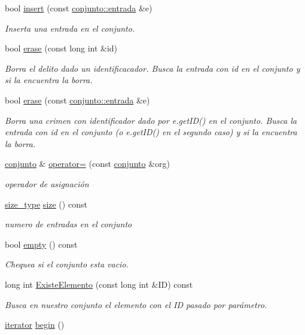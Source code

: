 \begin{DoxyCompactItemize}
bool \hyperlink{classconjunto_aa65b9f7c4cb9bad6d4e40c1973095930}{insert} (const \hyperlink{classconjunto_a09cad766dd65de73e51eae21f9d22585}{conjunto\+::entrada} \&e)
\begin{DoxyCompactList}\small\item\em Inserta una entrada en el conjunto. \end{DoxyCompactList}\item 
bool \hyperlink{classconjunto_ad550177fa4454da3a10fa356417e39a7}{erase} (const long int \&id)
\begin{DoxyCompactList}\small\item\em Borra el delito dado un identificacador. Busca la entrada con id en el conjunto y si la encuentra la borra. \end{DoxyCompactList}\item 
bool \hyperlink{classconjunto_a77a21ed91f1002f4eaed48d86535a874}{erase} (const \hyperlink{classconjunto_a09cad766dd65de73e51eae21f9d22585}{conjunto\+::entrada} \&e)
\begin{DoxyCompactList}\small\item\em Borra una crimen con identificador dado por e.\+get\+I\+D() en el conjunto. Busca la entrada con id en el conjunto (o e.\+get\+I\+D() en el segundo caso) y si la encuentra la borra. \end{DoxyCompactList}\item 
\hyperlink{classconjunto}{conjunto} \& \hyperlink{classconjunto_a052fe2f4e16d01b54a86b90d7c8d5b25}{operator=} (const \hyperlink{classconjunto}{conjunto} \&org)
\begin{DoxyCompactList}\small\item\em operador de asignación \end{DoxyCompactList}\item 
\hyperlink{classconjunto_a855a5893bb0f5a851ab2dbf2b8aa6cc7}{size\+\_\+type} \hyperlink{classconjunto_a52ce2f5a076772be81f7d9bf0c22a558}{size} () const 
\begin{DoxyCompactList}\small\item\em numero de entradas en el conjunto \end{DoxyCompactList}\item 
bool \hyperlink{classconjunto_afcf4ff3ff3c1f83b63e901efebe93533}{empty} () const 
\begin{DoxyCompactList}\small\item\em Chequea si el conjunto esta vacio. \end{DoxyCompactList}\item 
long int \hyperlink{classconjunto_af67e76aaf3510123b7c0b549e37d7beb}{Existe\+Elemento} (const long int \&I\+D) const 
\begin{DoxyCompactList}\small\item\em Busca en nuestro conjunto el elemento con el I\+D pasado por parámetro. \end{DoxyCompactList}\item 
\hypertarget{classconjunto_af90b2324c2675dd4751a79f2e2ad8277}{}\hyperlink{classconjunto_1_1iterator}{iterator} \hyperlink{classconjunto_af90b2324c2675dd4751a79f2e2ad8277}{begin} ()\label{classconjunto_af90b2324c2675dd4751a79f2e2ad8277}


\end{DoxyCompactItemize}
